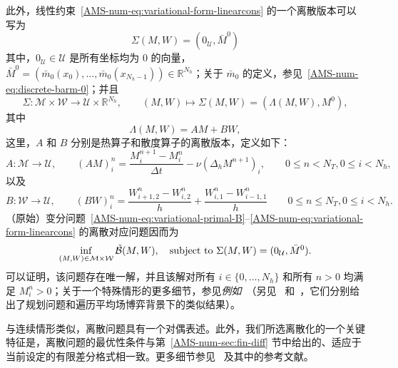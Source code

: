 \documentclass{amsproc}
\theoremstyle{definition}
\theoremstyle{remark}
\numberwithin{equation}{section}
\newcommand{\RR}{{\mathbb R}}
\newcommand{\cB}{{\mathcal B}}
\newcommand{\cM}{{\mathcal M}}
\newcommand{\cU}{{\mathcal U}}
\newcommand{\cW}{{\mathcal W}}
\begin{document}
      此外，线性约束~\eqref{AMS-num-eq:variational-form-linearcons} 的一个离散版本可以写为
      \begin{equation}
        \label{eq:var:5}  
	\Sigma(M,W) = (0_\cU, \bar M^0)
      \end{equation}
      其中，$0_\cU \in \cU$ 是所有坐标均为 $0$ 的向量，$\bar M^0 = (\bar m_0(x_0), \dots, \bar m_0(x_{N_h-1})) \in \RR^{N_h}$；关于 $\bar m_0$ 的定义，参见~\eqref{AMS-num-eq:discrete-barm-0}；并且
      \begin{equation}
\label{eq:var:6}  
	\Sigma: \cM \times \cW \to \cU \times \RR^{N_h},
	\qquad
	(M,W) \mapsto \Sigma(M,W) = (\Lambda(M,W), M^0),
      \end{equation}
      其中
      $$
      	\Lambda(M,W) = AM + BW,
	$$
	这里，$A$ 和 $B$ 分别是热算子和散度算子的离散版本，定义如下：
\begin{equation}
\label{eq:def-op-A}
	A: \cM \to \cU,
	\qquad
	(AM)^{n}_i = \frac{M^{n+1}_i - M^{n}_i}{\Delta t} - \nu (\Delta_h M^{n+1})_i, \qquad 0 \le n < N_T, 0 \le i < N_h,
\end{equation}
以及
\begin{equation}
\label{eq:def-op-B}
	B: \cW \to \cU,
	\qquad
	(BW)^{n}_i = \frac{W^{n}_{i+1,2} - W^{n}_{i,2}}{h} + \frac{W^{n}_{i,1} - W^{n}_{i-1,1}}{h} 
              \qquad 0 \le n \le N_T, 0 \le i < N_h.
\end{equation}
（原始）变分问题~\eqref{AMS-num-eq:variational-primal-B}--\eqref{AMS-num-eq:variational-form-linearcons} 的离散对应问题因而为
\begin{equation}
\label{eq:discrete-pb-short}
	\inf_{\substack{(M,W) \in \cM \times \cW}} \tilde\cB(M,W),  \quad \hbox {subject to } \Sigma(M,W) = (0_\cU, \bar M^0).
\end{equation}
可以证明，该问题存在唯一解，并且该解对所有 $i \in \{0, \dots, N_h\}$ 和所有 $n>0$ 均满足 $M^n_i >0$；关于一个特殊情形的更多细节，参见\textit{例如}~\cite[Theorem 3.1]{BricenoAriasetalCEMRACS2017}（另见~\cite[Section 6]{MR3135339} 和~\cite[Theorem 2.1]{MR3772008}，它们分别给出了规划问题和遍历平均场博弈背景下的类似结果）。


与连续情形类似，离散问题具有一个对偶表述。此外，我们所选离散化的一个关键特征是，离散问题的最优性条件与第~\ref{AMS-num-sec:fin-diff} 节中给出的、适应于当前设定的有限差分格式相一致。更多细节参见~\cite[Section 3]{achdoulauriere-2020-mfg-numerical} 及其中的参考文献。
\end{document}
